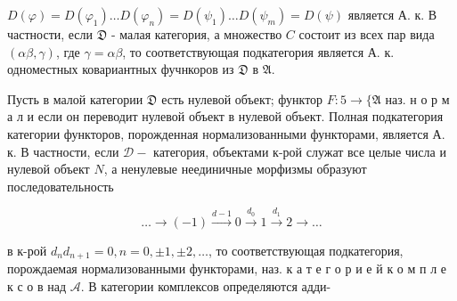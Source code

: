 \documentclass[10pt]{article}
\begin{document}
$D(\varphi)=D\left(\varphi_{1}\right) \ldots D\left(\varphi_{n}\right)=D\left(\psi_{1}\right) \ldots D\left(\psi_{m}\right)=D(\psi)$ является А. к. В частности, если $\mathfrak{D}$ - малая категория, а множество $C$ состоит из всех пар вида $(\alpha \beta, \gamma)$, где $\gamma=\alpha \beta$, то соответствующая подкатегория является А. к. одноместных ковариантных фучнкоров из $\mathfrak{D}$ в $\mathfrak{A}$.



Пусть в малой категории $\mathfrak{D}$ есть нулевой объект; функтор $F: 5 \rightarrow\{\mathfrak{A}$ наз. н о р м а л и если он переводит нулевой объект в нулевой объект. Полная подкатегория категории функторов, порожденная нормализованными функторами, является А. к. В частности, если $\mathscr{D}-$ категория, объектами к-рой служат все целые числа и нулевой объект $N$, а ненулевые неединичные морфизмы образуют последовательность



\[

\ldots \longrightarrow(-1) \stackrel{d-1}{\rightarrow} 0 \stackrel{d_{0}}{\rightarrow} 1 \stackrel{d_{1}}{\rightarrow} 2 \rightarrow \ldots

\]



в к-рой $d_{n} d_{n+1}=0, n=0, \pm 1, \pm 2, \ldots$, то соответствующая подкатегория, порождаемая нормализованными функторами, наз. к а т е г о р и е й к о м п л е к с о в над $\mathfrak{\mathcal { A }}$. В категории комплексов определяются адди-
\end{document}
